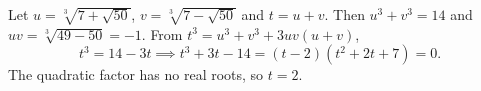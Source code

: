 Let $u=\sqrt[3]{7+\sqrt{50}}$, $v=\sqrt[3]{7-\sqrt{50}}$ and $t=u+v$. Then $u^3+v^3=14$ and $uv=\sqrt[3]{49-50}=-1$. From $t^3=u^3+v^3+3uv(u+v)$,
\[t^3=14-3t\implies t^3+3t-14=(t-2)(t^2+2t+7)=0.\]
The quadratic factor has no real roots, so $t=\boxed{2}$.

